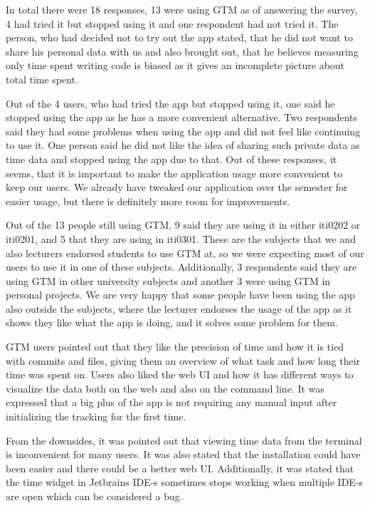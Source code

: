In total there were 18 responses, 13 were using GTM as of answering the survey, 4 had tried it but stopped using it and one respondent had not tried it.
The person, who had decided not to try out the app stated, that he did not want to share his personal data with us and also brought out,
that he believes measuring only time spent writing code is biased as it gives an incomplete picture about total time spent.

Out of the 4 users, who had tried the app but stopped using it, one said he stopped using the app as he has a more convenient alternative.
Two respondents said they had some problems when using the app and did not feel like continuing to use it.
One person said he did not like the idea of sharing such private data as time data and stopped using the app due to that.
Out of these responses, it seems, that it is important to make the application usage more convenient to keep our users.
We already have tweaked our application over the semester for easier usage, but there is definitely more room for improvements.

Out of the 13 people still using GTM, 9 said they are using it in either iti0202 or iti0201, and 5 that they are using in iti0301.
These are the subjects that we and also lecturers endorsed students to use GTM at, so we were expecting most of our
users to use it in one of these subjects.
Additionally, 3 respondents said they are using GTM in other university subjects and another 3 were using GTM in personal projects.
We are very happy that some people have been using the app also outside the subjects, where the lecturer endorses the usage of the app
as it shows they like what the app is doing, and it solves some problem for them.

GTM users pointed out that they like the precision of time and how it is tied with commits and files, giving them an overview
of what task and how long their time was spent on.
Users also liked the web UI and how it has different ways to visualize the data both on the web and also on the command line.
It was expressed that a big plus of the app is not requiring any manual input after initializing the tracking for the first time.

From the downsides, it was pointed out that viewing time data from the terminal is inconvenient for many users.
It was also stated that the installation could have been easier and there could be a better web UI.
Additionally, it was stated that the time widget in Jetbrains IDE-s sometimes stops working when multiple IDE-s are open
which can be considered a bug.

